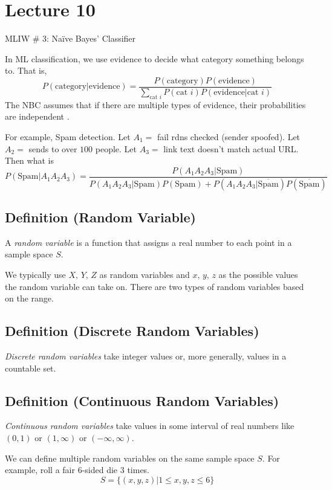 \section{Lecture 10}
MLIW \# 3: Naïve Bayes' Classifier

In ML classification, we use evidence to decide what category something
belongs to. That is,
\[ P(\text{category}|\text{evidence})=\frac{P(\text{category})P(\text{evidence})}
{\sum\limits_{\text{cat }i} P(\text{cat }i)P(\text{evidence}|\text{cat }i)} \]
The NBC assumes that if there are multiple types of evidence, their probabilities
are independent .

For example, Spam detection. Let $ A_1= $ fail rdns checked (sender spoofed).
Let $ A_2= $ sends to over $ 100 $ people. Let $ A_3= $ link text doesn't
match actual URL. Then what is
\[P(\text{Spam}|A_1A_2A_3) =\frac{P(A_1A_2A_3|\text{Spam})}{P(A_1A_2A_3|\text{Spam})P(\text{Spam})+
P(A_1A_2A_3|\overline{\text{Spam}})P(\overline{\text{Spam}})}  \]

\textbf{}

\begin{defbox}
    \subsection{Definition (Random Variable)}
    A \emph{random variable} is a function that assigns a real number to each point in
    a sample space $S$.
\end{defbox}
We typically use $ X,\,Y,\,Z $ as random variables and $ x,\,y,\,z $ as the
possible values the random variable can take on. There are two types
of random variables based on the range.
\begin{defbox}
    \subsection{Definition (Discrete Random Variables)}
    \emph{Discrete random variables} take integer values or, more generally, values in a
    countable set.
\end{defbox}
\begin{defbox}
    \subsection{Definition (Continuous Random Variables)}
    \emph{Continuous random variables} take values in some interval of real numbers
    like $(0,1)$ or $(1,\infty)$ or $ (-\infty,\infty) $.
\end{defbox}
We can define multiple random variables on the same sample space $ S $. For example,
roll a fair $ 6 $-sided die $ 3 $ times.
\[ S=\{(x,y,z)|1\le x, y, z\le 6\} \]

